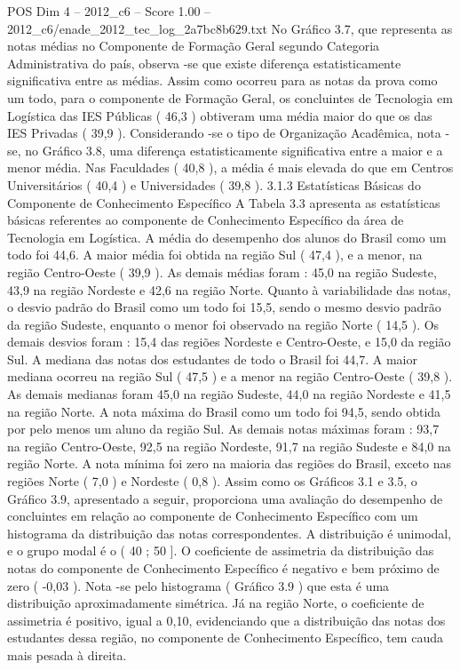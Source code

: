\begin{textsample}{POS Dim 4 – 2012\_c6 – Score 1.00 – 2012\_c6/enade\_2012\_tec\_log\_2a7bc8b629.txt}
No Gráfico 3.7, que representa as notas médias no Componente de Formação Geral segundo Categoria Administrativa do país, observa -se que existe diferença estatisticamente significativa entre as médias.
Assim como ocorreu para as notas da prova como um todo, para o componente de Formação Geral, os concluintes de Tecnologia em Logística das IES Públicas ( 46,3 ) obtiveram uma média maior do que os das IES Privadas ( 39,9 ).
Considerando -se o tipo de Organização Acadêmica, nota -se, no Gráfico 3.8, uma diferença estatisticamente significativa entre a maior e a menor média.
Nas Faculdades ( 40,8 ), a média é mais elevada do que em Centros Universitários ( 40,4 ) e Universidades ( 39,8 ). 3.1.3 Estatísticas Básicas do Componente de Conhecimento Específico A Tabela 3.3 apresenta as estatísticas básicas referentes ao componente de Conhecimento Específico da área de Tecnologia em Logística.
A média do desempenho dos alunos do Brasil como um todo foi 44,6.
A maior média foi obtida na região Sul ( 47,4 ), e a menor, na região Centro-Oeste ( 39,9 ).
As demais médias foram : 45,0 na região Sudeste, 43,9 na região Nordeste e 42,6 na região Norte.
Quanto à variabilidade das notas, o desvio padrão do Brasil como um todo foi 15,5, sendo o mesmo desvio padrão da região Sudeste, enquanto o menor foi observado na região Norte ( 14,5 ).
Os demais desvios foram : 15,4 das regiões Nordeste e Centro-Oeste, e 15,0 da região Sul.
A mediana das notas dos estudantes de todo o Brasil foi 44,7.
A maior mediana ocorreu na região Sul ( 47,5 ) e a menor na região Centro-Oeste ( 39,8 ).
As demais medianas foram 45,0 na região Sudeste, 44,0 na região Nordeste e 41,5 na região Norte.
A nota máxima do Brasil como um todo foi 94,5, sendo obtida por pelo menos um aluno da região Sul.
As demais notas máximas foram : 93,7 na região Centro-Oeste, 92,5 na região Nordeste, 91,7 na região Sudeste e 84,0 na região Norte.
A nota mínima foi zero na maioria das regiões do Brasil, exceto nas regiões Norte ( 7,0 ) e Nordeste ( 0,8 ).
Assim como os Gráficos 3.1 e 3.5, o Gráfico 3.9, apresentado a seguir, proporciona uma avaliação do desempenho de concluintes em relação ao componente de Conhecimento Específico com um histograma da distribuição das notas correspondentes.
A distribuição é unimodal, e o grupo modal é o ( 40 ; 50 ].
O coeficiente de assimetria da distribuição das notas do componente de Conhecimento Específico é negativo e bem próximo de zero ( -0,03 ).
Nota -se pelo histograma ( Gráfico 3.9 ) que esta é uma distribuição aproximadamente simétrica.
Já na região Norte, o coeficiente de assimetria é positivo, igual a 0,10, evidenciando que a distribuição das notas dos estudantes dessa região, no componente de Conhecimento Específico, tem cauda mais pesada à direita.

\end{textsample}
